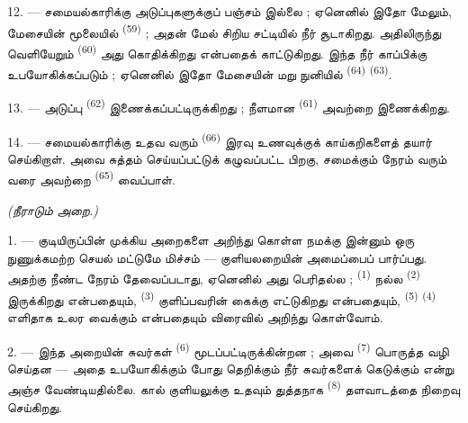 12. --- சமையல்காரிக்கு அடுப்புகளுக்குப் பஞ்சம் இல்லை ; ஏனெனில் இதோ
மேலும், மேசையின் மூலையில்  \textsuperscript{(59)} ;
அதன் மேல் சிறிய சட்டியில் நீர் சூடாகிறது. அதிலிருந்து வெளியேறும்
 \textsuperscript{(60)} அது கொதிக்கிறது என்பதைக்
காட்டுகிறது. இந்த நீர் காப்பிக்கு உபயோகிக்கப்படும் ; ஏனெனில் இதோ
மேசையின் மறு நுனியில்  \textsuperscript{(64)}
 \textsuperscript{(63)}.

13. --- அடுப்பு  \textsuperscript{(62)}
இணைக்கப்பட்டிருக்கிறது ; நீளமான 
\textsuperscript{(61)} அவற்றை இணைக்கிறது.

14. --- சமையல்காரிக்கு உதவ வரும் 
\textsuperscript{(66)} இரவு உணவுக்குக் காய்கறிகளைத் தயார் செய்கிறாள்.
அவை சுத்தம் செய்யப்பட்டுக் கழுவப்பட்ட பிறகு, சமைக்கும் நேரம் வரும்
வரை அவற்றை  \textsuperscript{(65)} வைப்பாள்.

\VUsaut{4.0mm}
{\centering\fontsize{10.2pt}{10.2pt}\selectfont{} \textit{(நீராடும் அறை.)}\par}
\VUsaut{3.0mm}

1. --- குடியிருப்பின் முக்கிய அறைகளை அறிந்து கொள்ள நமக்கு இன்னும் ஒரு
நுணுக்கமற்ற செயல் மட்டுமே மிச்சம் — குளியலறையின் அமைப்பைப் பார்ப்பது.
அதற்கு நீண்ட நேரம் தேவைப்படாது, ஏனெனில் அது பெரிதல்ல ;  \textsuperscript{(1)} நல்ல 
\textsuperscript{(2)} இருக்கிறது என்பதையும், 
\textsuperscript{(3)} குளிப்பவரின் கைக்கு எட்டுகிறது என்பதையும்,
 \textsuperscript{(5)} 
\textsuperscript{(4)} எளிதாக உலர வைக்கும் என்பதையும் விரைவில்
அறிந்து கொள்வோம்.

2. --- இந்த அறையின் சுவர்கள் 
\textsuperscript{(6)} மூடப்பட்டிருக்கின்றன ; அவை  \textsuperscript{(7)} பொருத்த வழி செய்தன — அதை உபயோகிக்கும்
போது தெறிக்கும் நீர் சுவர்களைக் கெடுக்கும் என்று அஞ்ச வேண்டியதில்லை.
கால் குளியலுக்கு உதவும் துத்தநாக 
\textsuperscript{(8)} தளவாடத்தை நிறைவு செய்கிறது.

\VUsaut{6.0mm}
\VUfilet{22mm}
